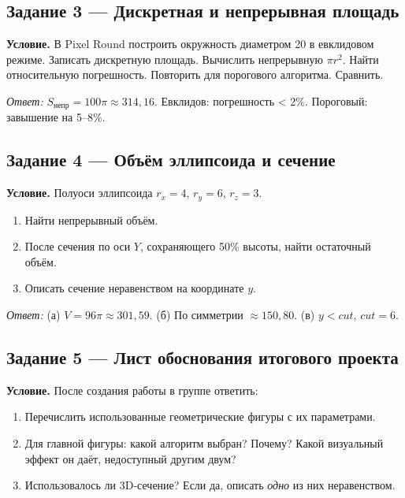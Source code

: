\documentclass[12pt,a4paper]{scrartcl}
\begin{document}
\subsection*{Задание 3 --- Дискретная и непрерывная площадь}
\textbf{Условие.} В Pixel Round построить окружность диаметром 20 в евклидовом режиме. Записать дискретную площадь. Вычислить непрерывную $\pi r^2$. Найти относительную погрешность. Повторить для порогового алгоритма. Сравнить.

\emph{Ответ:} $S_{\text{непр}} = 100\pi \approx 314{,}16$. Евклидов: погрешность < 2\%. Пороговый: завышение на 5--8\%.

\subsection*{Задание 4 --- Объём эллипсоида и сечение}
\textbf{Условие.} Полуоси эллипсоида $r_x = 4$, $r_y = 6$, $r_z = 3$.
\begin{enumerate}[label=\alph*),leftmargin=1.5em,itemsep=0.1em,topsep=0.2em,nosep]
  \item Найти непрерывный объём.
  \item После сечения по оси $Y$, сохраняющего 50\% высоты, найти остаточный объём.
  \item Описать сечение неравенством на координате $y$.
\end{enumerate}

\emph{Ответ:}
(а) $V = 96\pi \approx 301{,}59$.
(б) По симметрии $\approx 150{,}80$.
(в) $y < \mathit{cut}$, $\mathit{cut} = 6$.

\subsection*{Задание 5 --- Лист обоснования итогового проекта}
\textbf{Условие.} После создания работы в группе ответить:
\begin{enumerate}[label=(\arabic*),leftmargin=1.7em,itemsep=0.15em,topsep=0.2em,nosep]
  \item Перечислить использованные геометрические фигуры с их параметрами.
  \item Для главной фигуры: какой алгоритм выбран? Почему? Какой визуальный эффект он даёт, недоступный другим двум?
  \item Использовалось ли 3D-сечение? Если да, описать \emph{одно} из них неравенством.
\end{enumerate}

\newpage
\end{document}
